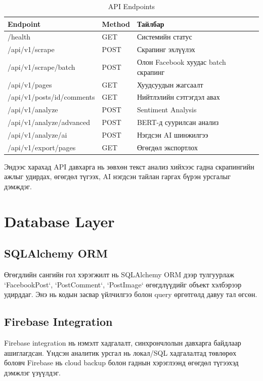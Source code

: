 \documentclass[12pt,a4paper]{report}
\begin{document}
\begin{table}[H]
\centering
\caption{API Endpoints}
\begin{tabular}{|l|l|p{6cm}|}
\hline
\textbf{Endpoint} & \textbf{Method} & \textbf{Тайлбар} \\
\hline
/health & GET & Системийн статус \\
/api/v1/scrape & POST & Скрапинг эхлүүлэх \\
/api/v1/scrape/batch & POST & Олон Facebook хуудас batch скрапинг \\
/api/v1/pages & GET & Хуудсуудын жагсаалт \\
/api/v1/posts/{id}/comments & GET & Нийтлэлийн сэтгэгдэл авах \\
/api/v1/analyze & POST & Sentiment Analysis \\
/api/v1/analyze/advanced & POST & BERT-д суурилсан анализ \\
/api/v1/analyze/ai & POST & Нэгдсэн AI шинжилгээ \\
/api/v1/export/pages & GET & Өгөгдөл экспортлох \\
\hline
\end{tabular}
\end{table}

Эндээс харахад API давхарга нь зөвхөн текст анализ хийхээс гадна скрапингийн ажлыг удирдах, өгөгдөл түгээх, AI нэгдсэн тайлан гаргах бүрэн урсгалыг дэмждэг.


\section{Database Layer}

\subsection{SQLAlchemy ORM}

Өгөгдлийн сангийн гол хэрэгжилт нь SQLAlchemy ORM дээр тулгуурлаж `FacebookPost`, `PostComment`, `PostImage` өгөгдлүүдийг объект хэлбэрээр удирддаг. Энэ нь кодын засвар үйлчилгээ болон query өргөтгөлд давуу тал өгсөн.


\subsection{Firebase Integration}

Firebase integration нь нэмэлт хадгалалт, синхрончлолын давхарга байдлаар ашиглагдсан. Үндсэн аналитик урсгал нь локал/SQL хадгалалтад төвлөрөх боловч Firebase нь cloud backup болон гаднын хэрэглээнд өгөгдөл түгээхэд дэмжлэг үзүүлдэг.
\end{document}
